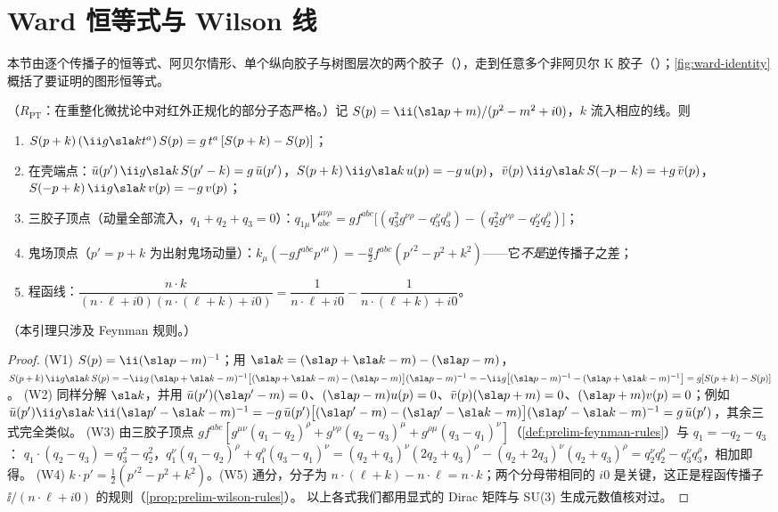 \section{Ward 恒等式与 Wilson 线}\label{sec:method-ward}

本节由逐个传播子的恒等式、阿贝尔情形、单个纵向胶子与树图层次的两个胶子（\tagR），走到任意多个非阿贝尔 K 胶子（\tagA）；\cref{fig:ward-identity}概括了要证明的图形恒等式。

\begin{lemma}\label{lem:method-ward-elementary}
（$R_{\mathrm{PT}}$：在重整化微扰论中对红外正规化的部分子态严格。）记 $S(p)=\ii(\sla p+m)/(p^2-m^2+i0)$，$k$ 流入相应的线。则
\begin{enumerate}[label=(W\arabic*),leftmargin=2.6em,itemsep=1pt,topsep=2pt]
\item $S(p+k)\,(\ii g\sla kt^a)\,S(p)=g\,t^a\,[S(p+k)-S(p)]$；
\item 在壳端点：$\bar u(p')\,\ii g\sla k\,S(p'-k)=g\,\bar u(p')$，$S(p+k)\,\ii g\sla k\,u(p)=-g\,u(p)$，$\bar v(p)\,\ii g\sla k\,S(-p-k)=+g\,\bar v(p)$，$S(-p+k)\,\ii g\sla k\,v(p)=-g\,v(p)$；
\item 三胶子顶点（动量全部流入，$q_1+q_2+q_3=0$）：$q_{1\mu}V^{\mu\nu\rho}_{abc}=gf^{abc}\bigl[(q_3^2g^{\nu\rho}-q_3^\nu q_3^\rho)-(q_2^2g^{\nu\rho}-q_2^\nu q_2^\rho)\bigr]$；
\item 鬼场顶点（$p'=p+k$ 为出射鬼场动量）：$k_\mu(-gf^{abc}p'^\mu)=-\frac g2f^{abc}(p'^2-p^2+k^2)$——它\emph{不是}逆传播子之差；
\item 程函线：$\dfrac{n\cdot k}{(n\cdot\ell+i0)(n\cdot(\ell+k)+i0)}=\dfrac1{n\cdot\ell+i0}-\dfrac1{n\cdot(\ell+k)+i0}$。
\end{enumerate}
（本引理只涉及 Feynman 规则。）
\end{lemma}

\begin{proof}
(W1) $S(p)=\ii(\sla p-m)^{-1}$；用 $\sla k=(\sla p+\sla k-m)-(\sla p-m)$，
$S(p+k)\,\ii g\sla k\,S(p)=-\ii g\,(\sla p+\sla k-m)^{-1}\bigl[(\sla p+\sla k-m)-(\sla p-m)\bigr](\sla p-m)^{-1}=-\ii g\bigl[(\sla p-m)^{-1}-(\sla p+\sla k-m)^{-1}\bigr]=g[S(p+k)-S(p)]$。
(W2) 同样分解 $\sla k$，并用 $\bar u(p')(\sla p'-m)=0$、$(\sla p-m)u(p)=0$、$\bar v(p)(\sla p+m)=0$、$(\sla p+m)v(p)=0$；例如
$\bar u(p')\ii g\sla k\,\ii(\sla p'-\sla k-m)^{-1}=-g\,\bar u(p')\bigl[(\sla p'-m)-(\sla p'-\sla k-m)\bigr](\sla p'-\sla k-m)^{-1}=g\,\bar u(p')$，其余三式完全类似。
(W3) 由三胶子顶点 $gf^{abc}[g^{\mu\nu}(q_1-q_2)^\rho+g^{\nu\rho}(q_2-q_3)^\mu+g^{\rho\mu}(q_3-q_1)^\nu]$（\cref{def:prelim-feynman-rules}）与 $q_1=-q_2-q_3$：
$q_1\cdot(q_2-q_3)=q_3^2-q_2^2$，$q_1^\nu(q_1-q_2)^\rho+q_1^\rho(q_3-q_1)^\nu=(q_2+q_3)^\nu(2q_2+q_3)^\rho-(q_2+2q_3)^\nu(q_2+q_3)^\rho=q_2^\nu q_2^\rho-q_3^\nu q_3^\rho$，相加即得。
(W4) $k\cdot p'=\frac12(p'^2-p^2+k^2)$。(W5) 通分，分子为 $n\cdot(\ell+k)-n\cdot\ell=n\cdot k$；两个分母带相同的 $i0$ 是关键，这正是程函传播子 $\ii/(n\cdot\ell+i0)$ 的规则（\cref{prop:prelim-wilson-rules}）。
以上各式我们都用显式的 Dirac 矩阵与 SU(3) 生成元数值核对过。%
\end{proof}

